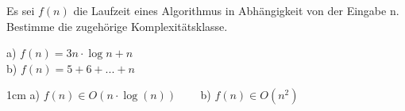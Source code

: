 \question[2]
Es sei $f(n)$ die Laufzeit eines Algorithmus in Abhängigkeit
von der Eingabe n. Bestimme die zugehörige
Komplexitätsklasse.

a) $f(n) = 3n \cdot \log n + n$  \\
b) $f(n) = 5 + 6 + ... + n$
\begin{solutionbox}{1cm}
a) $f(n) \in O(n \cdot \log(n))$  ~~~
b) $f(n) \in O(n^2)$
\end{solutionbox}
